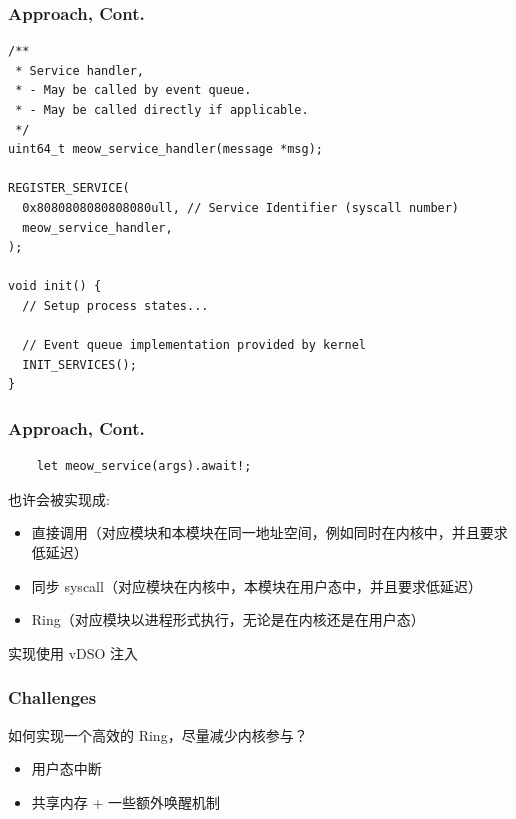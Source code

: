 \documentclass[UTF-8]{ctexbeamer}
\begin{document}
\begin{frame}[fragile]
  \frametitle{Approach, Cont.}

  \small
  \begin{verbatim}
/**
 * Service handler,
 * - May be called by event queue.
 * - May be called directly if applicable.
 */
uint64_t meow_service_handler(message *msg);

REGISTER_SERVICE(
  0x8080808080808080ull, // Service Identifier (syscall number)
  meow_service_handler,
);

void init() {
  // Setup process states...

  // Event queue implementation provided by kernel
  INIT_SERVICES();
}
  \end{verbatim}
\end{frame}

\begin{frame}[fragile]
  \frametitle{Approach, Cont.}
  \begin{verbatim}
    let meow_service(args).await!;
  \end{verbatim}

  \pause
  \vspace*{1em}

  也许会被实现成:
  \begin{itemize}
    \item 直接调用（对应模块和本模块在同一地址空间，例如同时在内核中，并且要求低延迟）
    \item 同步 syscall（对应模块在内核中，本模块在用户态中，并且要求低延迟）
    \item Ring（对应模块以进程形式执行，无论是在内核还是在用户态）
  \end{itemize}

  \pause
  \vspace*{1em}

  实现使用 vDSO 注入
\end{frame}

\begin{frame}
  \frametitle{Challenges}

  如何实现一个高效的 Ring，尽量减少内核参与？

  \pause

  \begin{itemize}
    \item 用户态中断
    \item 共享内存 + 一些额外唤醒机制
  \end{itemize}
\end{frame}
\end{document}
